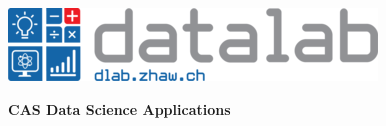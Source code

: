 \noindent
\begin{minipage}[t]{0.4\textwidth} 
\includegraphics[width=\linewidth]{logo_cas.png}
\end{minipage}%
\hfill%
\begin{minipage}[t]{0.6\textwidth}\raggedleft
\textbf{\large CAS Data Science Applications}
\end{minipage}


